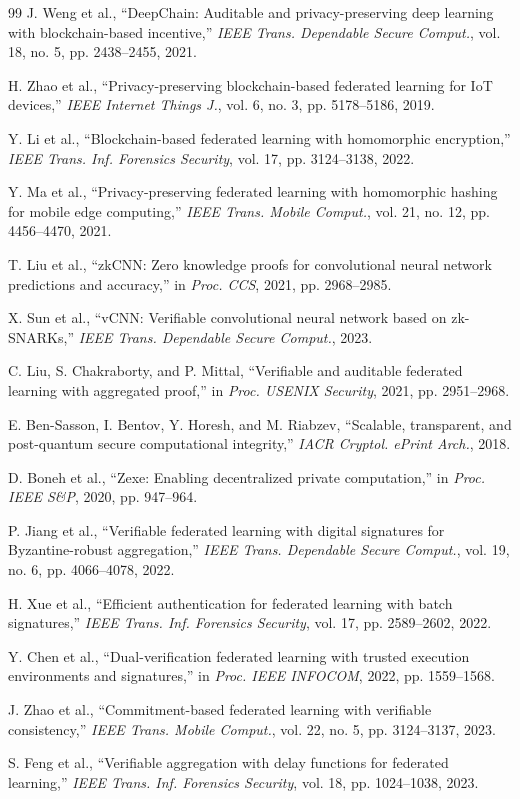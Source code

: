 \begin{thebibliography}{99}
J. Weng et al., ``DeepChain: Auditable and privacy-preserving deep learning with blockchain-based incentive,'' \textit{IEEE Trans. Dependable Secure Comput.}, vol. 18, no. 5, pp. 2438--2455, 2021.

H. Zhao et al., ``Privacy-preserving blockchain-based federated learning for IoT devices,'' \textit{IEEE Internet Things J.}, vol. 6, no. 3, pp. 5178--5186, 2019.

Y. Li et al., ``Blockchain-based federated learning with homomorphic encryption,'' \textit{IEEE Trans. Inf. Forensics Security}, vol. 17, pp. 3124--3138, 2022.

Y. Ma et al., ``Privacy-preserving federated learning with homomorphic hashing for mobile edge computing,'' \textit{IEEE Trans. Mobile Comput.}, vol. 21, no. 12, pp. 4456--4470, 2021.

T. Liu et al., ``zkCNN: Zero knowledge proofs for convolutional neural network predictions and accuracy,'' in \textit{Proc. CCS}, 2021, pp. 2968--2985.

X. Sun et al., ``vCNN: Verifiable convolutional neural network based on zk-SNARKs,'' \textit{IEEE Trans. Dependable Secure Comput.}, 2023.

C. Liu, S. Chakraborty, and P. Mittal, ``Verifiable and auditable federated learning with aggregated proof,'' in \textit{Proc. USENIX Security}, 2021, pp. 2951--2968.

E. Ben-Sasson, I. Bentov, Y. Horesh, and M. Riabzev, ``Scalable, transparent, and post-quantum secure computational integrity,'' \textit{IACR Cryptol. ePrint Arch.}, 2018.

D. Boneh et al., ``Zexe: Enabling decentralized private computation,'' in \textit{Proc. IEEE S\&P}, 2020, pp. 947--964.

P. Jiang et al., ``Verifiable federated learning with digital signatures for Byzantine-robust aggregation,'' \textit{IEEE Trans. Dependable Secure Comput.}, vol. 19, no. 6, pp. 4066--4078, 2022.

H. Xue et al., ``Efficient authentication for federated learning with batch signatures,'' \textit{IEEE Trans. Inf. Forensics Security}, vol. 17, pp. 2589--2602, 2022.

Y. Chen et al., ``Dual-verification federated learning with trusted execution environments and signatures,'' in \textit{Proc. IEEE INFOCOM}, 2022, pp. 1559--1568.

J. Zhao et al., ``Commitment-based federated learning with verifiable consistency,'' \textit{IEEE Trans. Mobile Comput.}, vol. 22, no. 5, pp. 3124--3137, 2023.

S. Feng et al., ``Verifiable aggregation with delay functions for federated learning,'' \textit{IEEE Trans. Inf. Forensics Security}, vol. 18, pp. 1024--1038, 2023.

\end{thebibliography}
